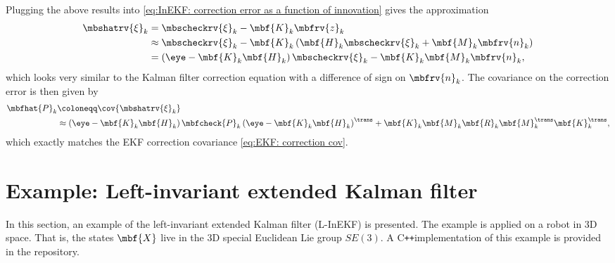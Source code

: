 \documentclass[nobib]{tufte-handout}
\newcommand{\cpp}{C\texttt{++}}
\begin{document}
    Plugging the above results into \eqref{eq:InEKF: correction error as a function of innovation} gives the approximation
    \begin{align}
        \mbshatrv{\xi}_{k} &= 
        \mbscheckrv{\xi}_{k} - \mbf{K}_{k}\mbfrv{z}_{k}\\
        &\approx
        \mbscheckrv{\xi}_{k} - \mbf{K}_{k}\left( \mbf{H}_{k}\mbscheckrv{\xi}_{k} + \mbf{M}_{k}\mbfrv{n}_{k} \right)\\
        &= \left( \eye - \mbf{K}_{k}\mbf{H}_{k} \right)\mbscheckrv{\xi}_{k} - \mbf{K}_{k}\mbf{M}_{k}\mbfrv{n}_{k},
    \end{align}
    which looks very similar to the Kalman filter correction equation with a difference of sign on $\mbfrv{n}_{k}$. The covariance on the correction error is then given by
    \begin{align}
        \mbfhat{P}_{k} &\coloneqq \cov{\mbshatrv{\xi}_{k}}\\
        &\approx \left( \eye - \mbf{K}_{k}\mbf{H}_{k} \right)\mbfcheck{P}_{k}\left( \eye - \mbf{K}_{k}\mbf{H}_{k} \right)^{\trans} + \mbf{K}_{k}\mbf{M}_{k}\mbf{R}_{k}\mbf{M}_{k}^{\trans}\mbf{K}_{k}^{\trans},
    \end{align}
    which exactly matches the EKF correction covariance \eqref{eq:EKF: correction cov}.


    \section{Example: Left-invariant extended Kalman filter}
    In this section, an example of the left-invariant extended Kalman filter (L-InEKF) is presented. The example is applied on a robot in 3D space. That is, the states $\mbf{X}$ live in the 3D special Euclidean Lie group $SE(3)$. A \cpp implementation of this example is provided in the repository.
\end{document}
